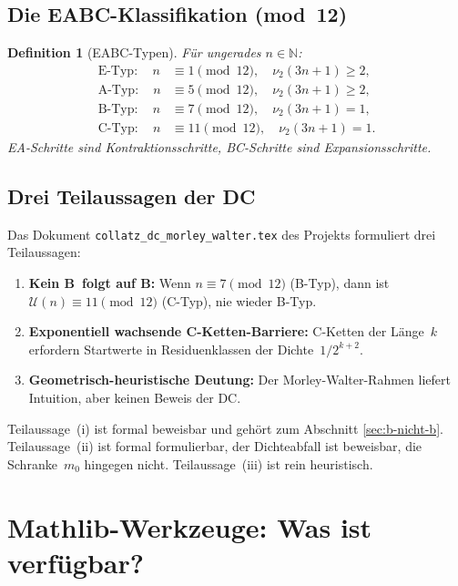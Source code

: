 \documentclass[12pt,a4paper]{article}
\newtheorem{definition}{Definition}[section]
\newcommand{\vii}{\nu_2}
\newcommand{\U}{\mathcal{U}}
\newcommand{\N}{\mathbb{N}}
\begin{document}
\subsection{Die EABC-Klassifikation (mod~12)}

\begin{definition}[EABC-Typen]\label{def:eabc}
Für ungerades $n \in \N$:
\begin{align*}
  \text{E-Typ}:\quad n &\equiv 1 \pmod{12}, \quad \vii(3n+1) \geq 2,\\
  \text{A-Typ}:\quad n &\equiv 5 \pmod{12}, \quad \vii(3n+1) \geq 2,\\
  \text{B-Typ}:\quad n &\equiv 7 \pmod{12}, \quad \vii(3n+1) = 1,\\
  \text{C-Typ}:\quad n &\equiv 11 \pmod{12}, \quad \vii(3n+1) = 1.
\end{align*}
EA-Schritte sind Kontraktionsschritte, BC-Schritte sind Expansionsschritte.
\end{definition}

\subsection{Drei Teilaussagen der DC}

Das Dokument \texttt{collatz\_dc\_morley\_walter.tex} des Projekts formuliert
drei Teilaussagen:

\begin{enumerate}[label=(\roman*)]
  \item \textbf{Kein B~folgt auf B:}
    Wenn $n \equiv 7 \pmod{12}$ (B-Typ), dann ist
    $\U(n) \equiv 11 \pmod{12}$ (C-Typ), nie wieder B-Typ.
  \item \textbf{Exponentiell wachsende C-Ketten-Barriere:}
    C-Ketten der Länge~$k$ erfordern Startwerte in Residuenklassen
    der Dichte~$1/2^{k+2}$.
  \item \textbf{Geometrisch-heuristische Deutung:}
    Der Morley-Walter-Rahmen liefert Intuition, aber keinen Beweis der DC.
\end{enumerate}

Teilaussage~(i) ist formal beweisbar und gehört zum Abschnitt \ref{sec:b-nicht-b}.
Teilaussage~(ii) ist formal formulierbar, der Dichteabfall ist beweisbar,
die Schranke~$m_0$ hingegen nicht.
Teilaussage~(iii) ist rein heuristisch.

\section{Mathlib-Werkzeuge: Was ist verfügbar?}
\label{sec:mathlib}
\end{document}
